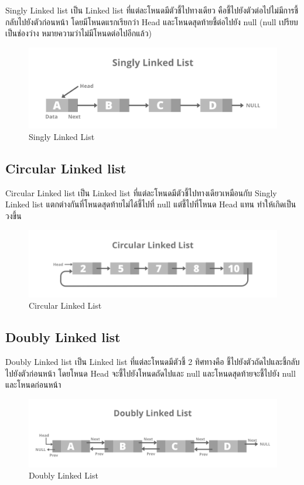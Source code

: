 Singly Linked list เป็น Linked list ที่แต่ละโหนดมีตัวชี้ไปทางเดียว คือชี้ไปยังตัวต่อไปไม่มีการชี้กลับไปยังตัวก่อนหน้า โดยมีโหนดแรกเรียกว่า Head และโหนดสุดท้ายชี้ต่อไปยัง null (null เปรียบเป็นช่องว่าง หมายความว่าไม่มีโหนดต่อไปอีกแล้ว) 

\begin{figure}[h!]
    \centering
    \includegraphics[width=12cm]{images/singly-list}
    \caption{Singly Linked List}
    \label{fig:singly-list}
\end{figure}

\subsection{Circular Linked list}

Circular Linked list เป็น Linked list ที่แต่ละโหนดมีตัวชี้ไปทางเดียวเหมือนกับ Singly Linked list แตกต่างกันที่โหนดสุดท้ายไม่ได้ชี้ไปที่ null แต่ชี้ไปที่โหนด Head แทน ทำให้เกิดเป็นวงขึ้น

\begin{figure}[h!]
    \centering
    \includegraphics[width=12cm]{images/circular-list}
    \caption{Circular Linked List}
    \label{fig:circular-list}
\end{figure}

\subsection{Doubly Linked list}

Doubly Linked list เป็น Linked list ที่แต่ละโหนดมีตัวชี้ 2 ทิศทางคือ ชี้ไปยังตัวถัดไปและชี้กลับไปยังตัวก่อนหน้า โดยโหนด Head จะชี้ไปยังโหนดถัดไปและ null และโหนดสุดท้ายจะชี้ไปยัง null และโหนดก่อนหน้า

\begin{figure}[h!]
    \centering
    \includegraphics[width=12cm]{images/doubly-list}
    \caption{Doubly Linked List}
    \label{fig:doubly-list}
\end{figure}

